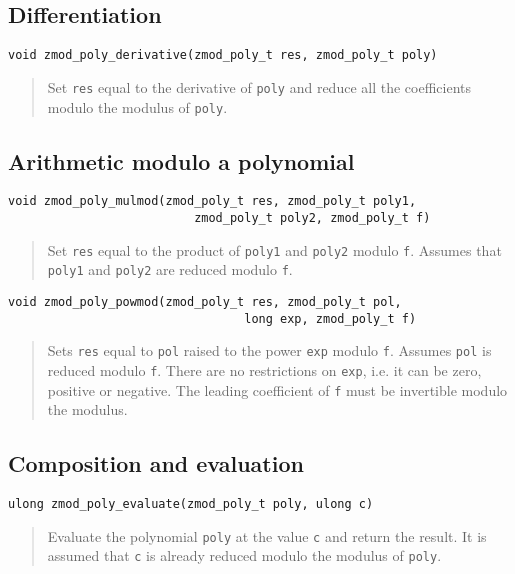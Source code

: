 \documentclass[a4paper,10pt]{article}
\newcommand{\code}{\lstinline}
\begin{document}
\subsection{Differentiation}
\begin{lstlisting}
void zmod_poly_derivative(zmod_poly_t res, zmod_poly_t poly)
\end{lstlisting}
\begin{quote}
Set \code{res} equal to the derivative of \code{poly} and reduce all the coefficients modulo the modulus of \code{poly}.
\end{quote}

\subsection{Arithmetic modulo a polynomial}

\begin{lstlisting}
void zmod_poly_mulmod(zmod_poly_t res, zmod_poly_t poly1,
                          zmod_poly_t poly2, zmod_poly_t f)
\end{lstlisting}
\begin{quote}
Set \code{res} equal to the product of \code{poly1} and \code{poly2} modulo \code{f}.  Assumes that \code{poly1} and \code{poly2} are reduced modulo \code{f}. 
\end{quote}

\begin{lstlisting}
void zmod_poly_powmod(zmod_poly_t res, zmod_poly_t pol,
                                 long exp, zmod_poly_t f)
\end{lstlisting}
\begin{quote}
Sets \code{res} equal to \code{pol} raised to the power \code{exp} modulo \code{f}.  Assumes \code{pol} is reduced modulo \code{f}.  There are no restrictions on \code{exp}, i.e. it can be zero, positive or negative.  The leading coefficient of \code{f} must be invertible modulo the modulus. 
\end{quote}

\subsection{Composition and evaluation}

\begin{lstlisting}
ulong zmod_poly_evaluate(zmod_poly_t poly, ulong c)
\end{lstlisting}
\begin{quote}
Evaluate the polynomial \code{poly} at the value \code{c} and return the result. It is assumed that \code{c} is already reduced modulo the modulus of \code{poly}.
\end{quote}
\end{document}
